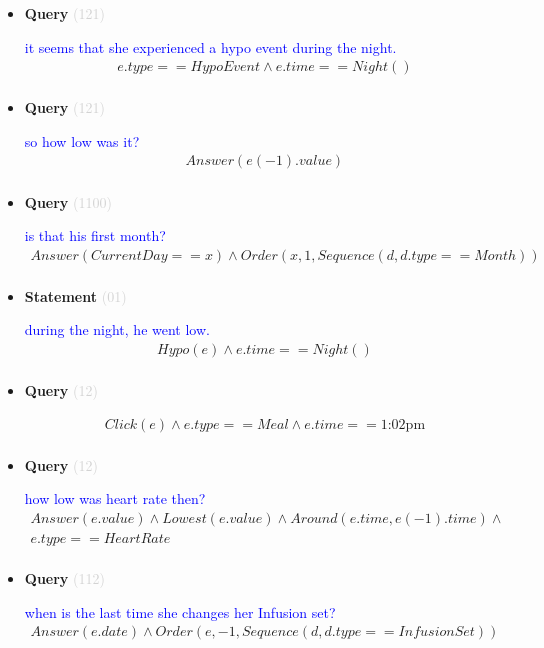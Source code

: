 \documentclass[11pt]{article}
\newcommand{\key}[1]{\textcolor{lightgray}{#1}}
\newcounter{CQuery}
\newcounter{CStatement}
\begin{document}
\begin{itemize}
\item
\textbf{Query\theCQuery} \key{(121)} \addtocounter{CQuery}{1}
\textcolor{blue}{ it seems that she experienced a hypo event during the night. }
\begin{multline*}
e.type==HypoEvent \wedge e.time==Night() \\ 
\end{multline*}


\item
\textbf{Query\theCQuery} \key{(121)} \addtocounter{CQuery}{1}
\textcolor{blue}{ so how low was it? }
\begin{multline*}
Answer(e(-1).value) \\ 
\end{multline*}


\item
\textbf{Query\theCQuery} \key{(1100)} \addtocounter{CQuery}{1}
\textcolor{blue}{ is that his first month? }
\begin{multline*}
Answer(CurrentDay==x) \wedge Order(x, 1, Sequence(d, d.type==Month)) \\ 
\end{multline*}


\item
\textbf{Statement\theCStatement} \key{(01)} \addtocounter{CStatement}{1}
\textcolor{blue}{ during the night, he went low. }
\begin{multline*}
Hypo(e) \wedge e.time==Night() \\ 
\end{multline*}


\item
\textbf{Query\theCQuery} \key{(12)} \addtocounter{CQuery}{1}
\textcolor{blue}{  }
\begin{multline*}
Click(e) \wedge e.type == Meal \wedge e.time==\mbox{1:02pm} \\ 
\end{multline*}


\item
\textbf{Query\theCQuery} \key{(12)} \addtocounter{CQuery}{1}
\textcolor{blue}{ how low was heart rate then? }
\begin{multline*}
Answer(e.value) \wedge Lowest(e.value) \wedge Around(e.time, e(-1).time) \wedge \\ 
e.type==HeartRate \\ 
\end{multline*}


\item
\textbf{Query\theCQuery} \key{(112)} \addtocounter{CQuery}{1}
\textcolor{blue}{ when is the last time she changes her Infusion set? }
\begin{multline*}
Answer(e.date) \wedge Order(e, -1, Sequence(d, d.type==InfusionSet)) \\ 
\end{multline*}



\end{itemize}
\end{document}
